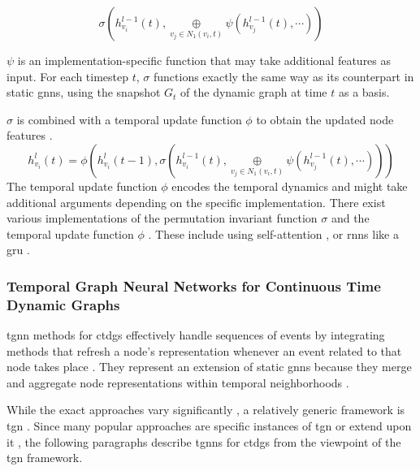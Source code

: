 \begin{equation}
    \sigma(h_{v_i}^{l-1}(t), \underset{v_j \in N_1(v_i, t)}{\oplus} \psi(h_{v_j}^{l-1}(t), \cdots))
\end{equation}

$\psi$ is an implementation-specific function that may take additional features as input. For each timestep $t$, $\sigma$ functions exactly the same way as its counterpart in static \glspl{gnn}, using the snapshot $G_t$ of the dynamic graph at time $t$ as a basis.

$\sigma$ is combined with a temporal update function $\phi$ to obtain the updated node features \cite{you_roland_2022}.
\begin{equation}
    h_{v_i}^l(t) = \phi(h_{v_i}^{l}(t-1), \sigma(h_{v_i}^{l-1}(t), \underset{v_j \in N_1(v_i, t)}{\oplus} \psi(h_{v_j}^{l-1}(t), \cdots)))
\end{equation}
The temporal update function $\phi$ encodes the temporal dynamics \cite{longa_graph_2023} and might take additional arguments depending on the specific implementation. There exist various implementations of the permutation invariant function $\sigma$ and the temporal update function $\phi$ \cite{longa_graph_2023}. These include using self-attention \cite{sankar_dysat_2020}, or \glspl{rnn} like a \gls{gru} \cite{you_roland_2022}.

\subsubsection{Temporal Graph Neural Networks for Continuous Time Dynamic Graphs}
\label{s_tgnns_for_ctdgs}
\gls{tgnn} methods for \glspl{ctdg} effectively handle sequences of events by integrating methods that refresh a node's representation whenever an event related to that node takes place \cite{longa_graph_2023}. They represent an extension of static \glspl{gnn} because they merge and aggregate node representations within temporal neighborhoods \cite{longa_graph_2023}.

While the exact approaches vary significantly \cite{longa_graph_2023}, a relatively generic framework is \gls{tgn} \cite{rossi_temporal_2020}. Since many popular approaches are specific instances of \gls{tgn} \cite{trivedi_dyrep_2019, rossi_temporal_2020} or extend upon it \cite{souza_provably_2022}, the following paragraphs describe \glspl{tgnn} for \glspl{ctdg} from the viewpoint of the \gls{tgn} framework.


